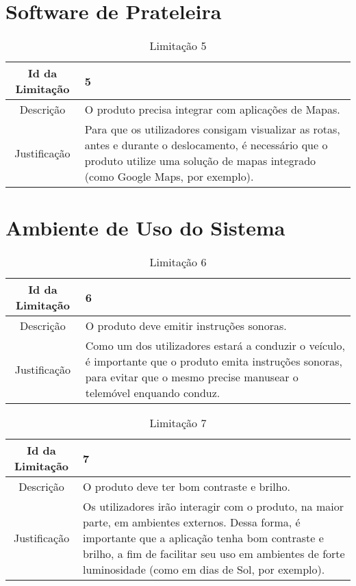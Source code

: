 \section{Software de Prateleira}\label{0:0.3.4}

\begin{table}[!h]
\begin{center}
    \begin{tabularx}{\textwidth}{ | c | X | }
    \hline
    Id da Limitação & 5 \\
    \hline
    Descrição & O produto precisa integrar com aplicações de Mapas. \\
    \hline
    Justificação & Para que os utilizadores consigam visualizar as rotas, antes e durante o deslocamento, é necessário que o produto utilize uma solução de mapas integrado (como Google Maps, por exemplo). \\
    \hline
    \end{tabularx}
    \caption{Limitação 5} \label{tab:r5}
\end{center}
\end{table}

\section{Ambiente de Uso do Sistema}\label{0:0.3.5}

\begin{table}[!h]
\begin{center}
    \begin{tabularx}{\textwidth}{ | c | X | }
    \hline
    Id da Limitação & 6 \\
    \hline
    Descrição & O produto deve emitir instruções sonoras. \\
    \hline
    Justificação & Como um dos utilizadores estará a conduzir o veículo, é importante que o produto emita instruções sonoras, para evitar que o mesmo precise manusear o telemóvel enquando conduz. \\
    \hline
    \end{tabularx}
    \caption{Limitação 6} \label{tab:r6}
\end{center}
\end{table}

\begin{table}[!h]
\begin{center}
    \begin{tabularx}{\textwidth}{ | c | X | }
    \hline
    Id da Limitação & 7 \\
    \hline
    Descrição & O produto deve ter bom contraste e brilho. \\
    \hline
    Justificação & Os utilizadores irão interagir com o produto, na maior parte, em ambientes externos. Dessa forma, é importante que a aplicação tenha bom contraste e brilho, a fim de facilitar seu uso em ambientes de forte luminosidade (como em dias de Sol, por exemplo). \\
    \hline
    \end{tabularx}
    \caption{Limitação 7} \label{tab:r7}
\end{center}
\end{table}

